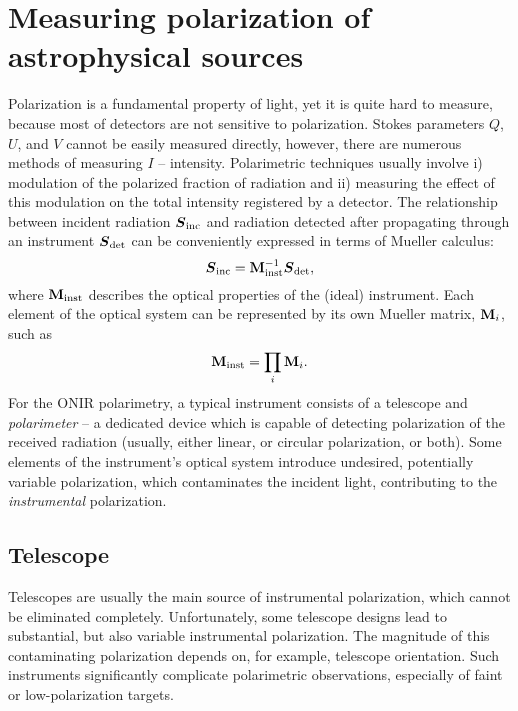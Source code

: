 \chapter{Measuring polarization of astrophysical sources}
Polarization is a fundamental property of light, yet it is quite hard to measure, because most of detectors are not sensitive to polarization.
Stokes parameters $Q$, $U$, and $V$ cannot be easily measured directly, however, there are numerous methods of measuring $I$ -- intensity.
Polarimetric techniques usually involve i) modulation of the polarized fraction of radiation and ii) measuring the effect of this modulation on the total intensity registered by a detector.
The relationship between incident radiation $\boldsymbol{S}_{\mathrm{inc}}$ and radiation detected after propagating through an instrument $\boldsymbol{S}_{\mathrm{det}}$ can be conveniently expressed in terms of Mueller calculus:
\begin{equation}
    \boldsymbol{S}_{\mathrm{inc}} = \mathbf{M}_{\mathrm{inst}}^{-1} \boldsymbol{S}_{\mathrm{det}},
\end{equation}
where $\mathbf{M}_{\mathrm{inst}}$ describes the optical properties of the (ideal) instrument.
Each element of the optical system can be represented by its own Mueller matrix, $\mathbf{M}_i$, such as
\begin{equation}
    \mathbf{M}_{\mathrm{inst}} = \prod\limits_i \mathbf{M}_i.
\end{equation}
For the \gls{ONIR} polarimetry, a typical instrument consists of a telescope and \textit{polarimeter} -- a dedicated device which is capable of detecting polarization of the received radiation (usually, either linear, or circular polarization, or both).
Some elements of the instrument's optical system introduce undesired, potentially variable polarization, which contaminates the incident light, contributing to the \textit{instrumental} polarization.


\section{Telescope}
Telescopes are usually the main source of instrumental polarization, which cannot be eliminated completely.
Unfortunately, some telescope designs lead to substantial, but also variable instrumental polarization.
The magnitude of this contaminating polarization depends on, for example, telescope orientation.
Such instruments significantly complicate polarimetric observations, especially of faint or low-polarization targets.

